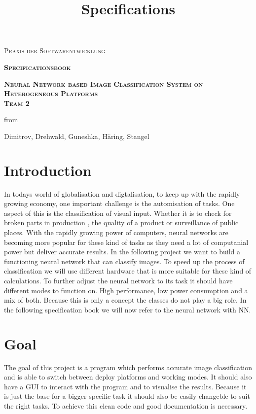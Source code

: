 \documentclass[parskip=full]{scrartcl}
\title{Specifications}
\author{}
\begin{document}
\renewcommand{\figurename}{Figure}
\begin{titlepage}
\centering
	\vspace{3cm}
	{\scshape\LARGE Praxis der Softwarentwicklung\par}
	\vspace{2cm}
	{\scshape\Huge\bfseries Specificationsbook \par}	
	\vspace{2cm}
	{\scshape\Huge\bfseries Neural Network based Image Classification System on Heterogeneous Platforms \\ Team 2 \par}
	\vspace{2cm}
	{\Large from \par}
	\vspace{0.25cm}
	{\Large Dimitrov, Drehwald, Guneshka, Häring, Stangel \par}
	\vfill
\end{titlepage}
\newpage
\tableofcontents
\newpage
\section{Introduction}
In todays world of globalisation and digtalisation, to keep up with the rapidly growing economy, one important challenge is the automisation of tasks. One aspect of this is the classification of visual input. Whether it is to check for broken parts in production , the quality of a product or surveillance of public places. With the rapidly growing power of computers, neural networks are becoming more popular for these kind of tasks as they need a lot of computanial power but deliver accurate results. In the following project we want to build a functioning neural network that can classify images. To speed up the process of classification we will use different hardware that is more suitable for these kind of calculations. To further adjust the neural network to its task it should have different modes to function on. High performance, low power consumption and a mix of both. Because this is only a concept the classes do not play a big role. In the following specification book we will now refer to the neural network with NN.

\section{Goal}
The goal of this project is a program which performs accurate image classification and is able to switch between deploy platforms and working modes.
It should also have a GUI to interact with the program and to visualise the results.
Because it is just the base for a bigger specific task it should also be easily changeble to suit the right tasks. To achieve this clean code and good documentation is necessary.
\end{document}
